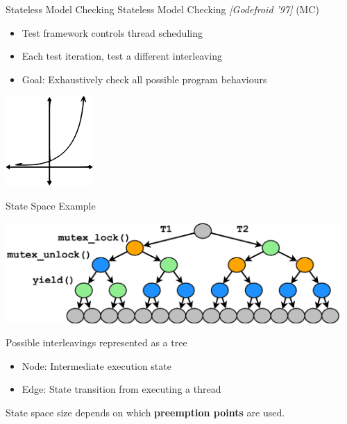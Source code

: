 \documentclass[xcolor=dvipsnames]{beamer}
\begin{document}
\begin{frame}{Stateless Model Checking}
	Stateless Model Checking {\em [Godefroid '97]} (MC)
	\begin{itemize}
		\item Test framework controls thread scheduling
		\item Each test iteration, test a different interleaving
		\item Goal: Exhaustively check all possible program behaviours
	\end{itemize}
	\pause
	\linegap

	\begin{center}
		\includegraphics[width=0.25\textwidth]{../../oopsla/exponential-curve.pdf}
	\end{center}
\end{frame}

\begin{frame}{State Space Example}
	\begin{center}
		\includegraphics[width=0.96\textwidth]{../../oopsla/tree-maximal-only.pdf}
	\end{center}
	\linegap

	Possible interleavings represented as a tree
	\begin{itemize}
		\item Node: Intermediate execution state
		\item Edge: State transition from executing a thread
	\end{itemize}
	\linegap

	State space size depends on which {\bf preemption points} are used.
\end{frame}
\end{document}
